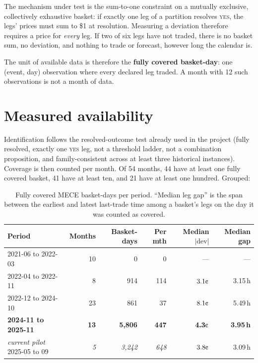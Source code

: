 \documentclass[11pt,a4paper]{article}
\newcommand{\cent}{\text{\textcent}}
\begin{document}
The mechanism under test is the sum-to-one constraint on a mutually exclusive,
collectively exhaustive basket: if exactly one leg of a partition resolves
\textsc{yes}, the legs' prices must sum to \$1 at resolution. Measuring a
deviation therefore requires a price for \emph{every} leg. If two of six legs
have not traded, there is no basket sum, no deviation, and nothing to trade or
forecast, however long the calendar is.

The unit of available data is therefore the \textbf{fully covered
basket-day}: one (event, day) observation where every declared leg traded. A
month with 12 such observations is not a month of data.

\section{Measured availability}

Identification follows the resolved-outcome test already used in the project
(fully resolved, exactly one \textsc{yes} leg, not a threshold ladder, not a
combination proposition, and family-consistent across at least three
historical instances). Coverage is then counted per month. Of 54 months, 44
have at least one fully covered basket, 41 have at least ten, and 21 have at
least one hundred. Grouped:

\begin{table}[ht]
\centering\small
\begin{tabular}{lrrrrr}
\toprule
Period & Months & Basket-days & Per mth & Median $|\mathrm{dev}|$ & Median gap \\
\midrule
2021-06 to 2022-03 & 10 & 0 & 0 & --- & --- \\
2022-04 to 2022-11 & 8 & 914 & 114 & $3.1\cent$ & 3.15\,h \\
2022-12 to 2024-10 & 23 & 861 & 37 & $8.1\cent$ & 5.49\,h \\
\textbf{2024-11 to 2025-11} & \textbf{13} & \textbf{5,806} & \textbf{447} & $\bm{4.3\cent}$ & \textbf{3.95\,h} \\
\midrule
\emph{current pilot} 2025-05 to 09 & \emph{5} & \emph{3,242} & \emph{648} & $3.8\cent$ & 3.09\,h \\
\bottomrule
\end{tabular}
\caption{Fully covered MECE basket-days per period. ``Median leg gap'' is the
span between the earliest and latest last-trade time among a basket's legs on
the day it was counted as covered.}
\end{table}
\end{document}
